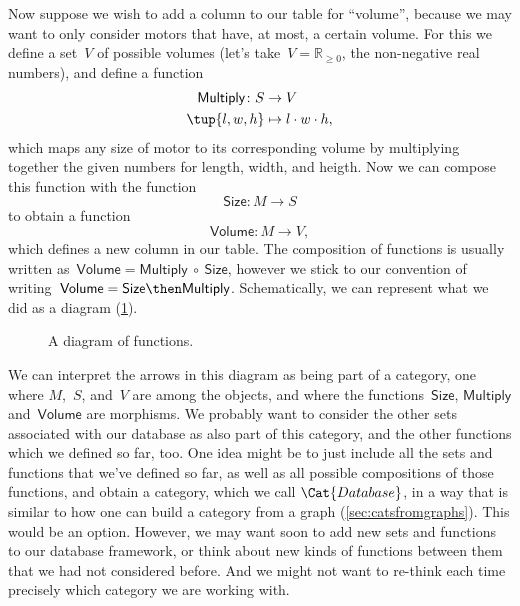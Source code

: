 Now suppose we wish to add a column to our table for ``volume'', because we may want to only consider motors that have, at most, a certain volume. For this we define a set~$V$ of possible volumes (let's take~$V = \mathbb{R}_{\geq 0}$, the non-negative real numbers), and define a function
\begin{equation*}
\begin{aligned}
\textsf{Multiply}\colon S &\to V\\
\tup{l, w, h} &\mapsto l \cdot w \cdot h,
\end{aligned}
\end{equation*}
which maps any size of motor to its corresponding volume by multiplying together the given numbers for length, width, and heigth.  Now we can compose this function with the function
\begin{equation*}
\textsf{Size}\colon M \to S
\end{equation*}
to obtain a function
\begin{equation*}
\textsf{Volume}\colon M \to V,
\end{equation*}
which defines a new column in our table. The composition of functions is usually written as~$\textsf{Volume} = \textsf{Multiply} \ \circ \ \textsf{Size}$, however we stick to our convention of writing~$\textsf{Volume} = \textsf{Size} \then \textsf{Multiply}$. Schematically, we can represent what we did as a diagram (\cref{fig:diagram_functions}).



\begin{figure}[h!]
\begin{center}
\end{center}
\caption{A diagram of functions. \label{fig:diagram_functions}}
\end{figure}

We can interpret the arrows in this diagram as being part of a category, one where $M$,~$S$, and~$V$ are among the objects, and where the functions~$\textsf{Size}$, $\textsf{Multiply}$ and~$\textsf{Volume}$ are morphisms. We probably want to consider the other sets associated with our database as also part of this category, and the other functions which we defined so far, too. One idea might be to just include all the sets and functions that we've defined so far, as well as all possible compositions of those functions, and obtain a category, which we call $\Cat{Database}$, in a way that is similar to how one can build a category from a graph (\cref{sec:catsfromgraphs}). This would be an option. However, we may want soon to add new sets and functions to our database framework, or think about new kinds of functions between them that we had not considered before. And we might not want to re-think each time precisely which category we are working with.


